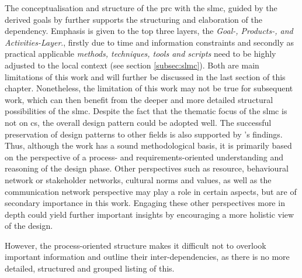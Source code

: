 The conceptualisation and structure of the \acrshort{prc} with the \acrlong{slmc}, guided by the derived goals by \autocite{minkmanCitizenScienceWater2015} further supports the structuring and elaboration of the dependency. Emphasis is given to the top three layers, the \textit{Goal-, Products-, and Activities-Layer}., firstly due to time and information constraints and secondly as practical applicable\textit{ methods, techniques, tools and scripts} need to be highly adjusted to the local context (see section \ref{subsec:slmc}). Both are main limitations of this work and will further be discussed in the last section of this chapter. Nonetheless, the limitation of this work may not be true for subsequent work, which can then benefit from the deeper and more detailed structural possibilities of the \acrshort{slmc}. Despite the fact that the thematic focus of the \acrshort{slmc} is not on \acrshort{cs}, the overall design pattern could be adopted well. The successful preservation of design patterns to other fields is also supported by \autocite{diggelenGroundedDesignDesign2009}'s findings. Thus, although the work has a sound methodological basis, it is primarily based on the perspective of a process- and requirements-oriented understanding and reasoning of the design phase. Other perspectives such as resource, behavioural network or stakeholder networks, cultural norms and values, as well as the communication network perspective may play a role in certain aspects, but are of secondary importance in this work. Engaging these other perspectives more in depth could yield further important insights by encouraging a more holistic view of the design.



However, the process-oriented structure makes it difficult not to overlook important information and outline their inter-dependencies, as there is no more detailed, structured and grouped listing of this. 